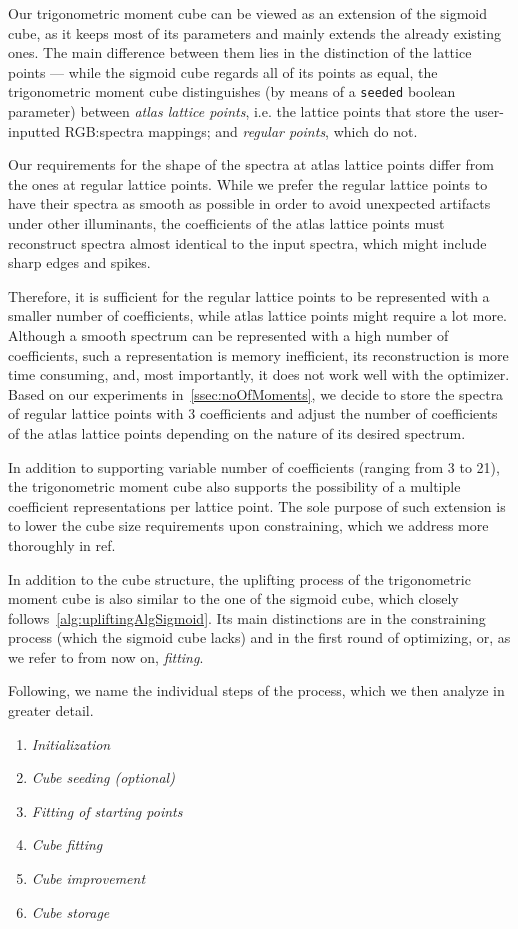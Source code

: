 Our trigonometric moment cube can be viewed as an extension of the sigmoid cube, as it keeps most of its parameters and mainly extends the already existing ones. The main difference between them lies in the distinction of the lattice points --- while the sigmoid cube regards all of its points as equal, the trigonometric moment cube distinguishes (by means of a \texttt{seeded} boolean parameter) between \emph{atlas lattice points}, i.e. the lattice points that store the user-inputted RGB:spectra mappings; and \emph{regular points}, which do not.

Our requirements for the shape of the spectra at atlas lattice points differ from the ones at regular lattice points. While we prefer the regular lattice points to have their spectra as smooth as possible in order to avoid unexpected artifacts under other illuminants, the coefficients of the atlas lattice points must reconstruct spectra almost identical to the input spectra, which might include sharp edges and spikes.

Therefore, it is sufficient for the regular lattice points to be represented with a smaller number of coefficients, while atlas lattice points might require a lot more. Although a smooth spectrum can be represented with a high number of coefficients, such a representation is memory inefficient, its reconstruction is more time consuming, and, most importantly, it does not work well with the optimizer. Based on our experiments in~\cref{ssec:noOfMoments}, we decide to store the spectra of regular lattice points with 3 coefficients and adjust the number of coefficients of the atlas lattice points depending on the nature of its desired spectrum.

In addition to supporting variable number of coefficients (ranging from 3 to 21), the trigonometric moment cube also supports the possibility of a multiple coefficient representations per lattice point. The sole purpose of such extension is to lower the cube size requirements upon constraining, which we address more thoroughly in ref.

In addition to the cube structure, the uplifting process of the trigonometric moment cube is also similar to the one of the sigmoid cube, which closely follows~\cref{alg:upliftingAlgSigmoid}. Its main distinctions are in the constraining process (which the sigmoid cube lacks) and in the first round of optimizing, or, as we refer to from now on, \emph{fitting}.

Following, we name the individual steps of the process, which we then analyze in greater detail.
\begin{enumerate}
	\item \emph{Initialization}
	\item \emph{Cube seeding (optional)}
	\item \emph{Fitting of starting points}
	\item \emph{Cube fitting}
	\item \emph{Cube improvement}
	\item \emph{Cube storage}
\end{enumerate}

